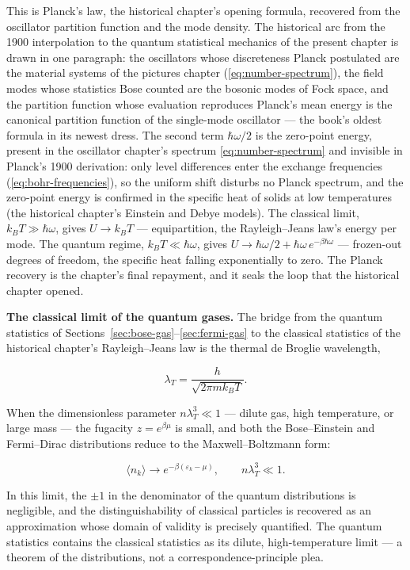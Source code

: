 This is Planck's law, the historical chapter's opening formula, recovered from the oscillator partition function and the mode density. The historical arc from the 1900 interpolation to the quantum statistical mechanics of the present chapter is drawn in one paragraph: the oscillators whose discreteness Planck postulated are the material systems of the pictures chapter (\eqref{eq:number-spectrum}), the field modes whose statistics Bose counted are the bosonic modes of Fock space, and the partition function whose evaluation reproduces Planck's mean energy is the canonical partition function of the single-mode oscillator --- the book's oldest formula in its newest dress. The second term $\hbar\omega/2$ is the zero-point energy, present in the oscillator chapter's spectrum \eqref{eq:number-spectrum} and invisible in Planck's 1900 derivation: only level differences enter the exchange frequencies (\eqref{eq:bohr-frequencies}), so the uniform shift disturbs no Planck spectrum, and the zero-point energy is confirmed in the specific heat of solids at low temperatures (the historical chapter's Einstein and Debye models). The classical limit, $k_B T \gg \hbar\omega$, gives $U \to k_B T$ --- equipartition, the Rayleigh--Jeans law's energy per mode. The quantum regime, $k_B T \ll \hbar\omega$, gives $U \to \hbar\omega/2 + \hbar\omega\,e^{-\beta\hbar\omega}$ --- frozen-out degrees of freedom, the specific heat falling exponentially to zero. The Planck recovery is the chapter's final repayment, and it seals the loop that the historical chapter opened.

\medskip\noindent\textbf{The classical limit of the quantum gases.}
The bridge from the quantum statistics of Sections~\ref{sec:bose-gas}--\ref{sec:fermi-gas} to the classical statistics of the historical chapter's Rayleigh--Jeans law is the thermal de Broglie wavelength,
\begin{linenomath}
    \begin{equation*}
        \lambda_T = \frac{h}{\sqrt{2\pi m k_B T}}.
    \end{equation*}
\end{linenomath}
When the dimensionless parameter $n\lambda_T^3 \ll 1$ --- dilute gas, high temperature, or large mass --- the fugacity $z = e^{\beta\mu}$ is small, and both the Bose--Einstein and Fermi--Dirac distributions reduce to the Maxwell--Boltzmann form:
\begin{linenomath}
    \begin{equation}
        \langle n_k \rangle \longrightarrow e^{-\beta(\varepsilon_k - \mu)},
        \qquad
        n\lambda_T^3 \ll 1.
        \label{eq:classical-limit}
    \end{equation}
\end{linenomath}
In this limit, the $\pm 1$ in the denominator of the quantum distributions is negligible, and the distinguishability of classical particles is recovered as an approximation whose domain of validity is precisely quantified. The quantum statistics contains the classical statistics as its dilute, high-temperature limit --- a theorem of the distributions, not a correspondence-principle plea.

